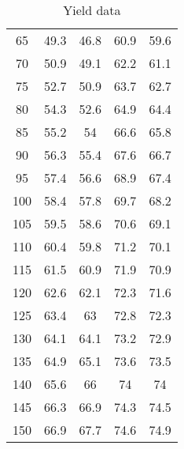 \documentclass[../Article_Model_Parameters.tex]{subfiles}
\begin{document}
\begin{table}[H]
\begin{tabular}{c|cccc}
			65       & 49.3                    & 46.8                    & 60.9                    & 59.6                    \\
			70       & 50.9                    & 49.1                    & 62.2                    & 61.1                    \\
			75       & 52.7                    & 50.9                    & 63.7                    & 62.7                    \\
			80       & 54.3                    & 52.6                    & 64.9                    & 64.4                    \\
			85       & 55.2                    & 54                      & 66.6                    & 65.8                    \\
			90       & 56.3                    & 55.4                    & 67.6                    & 66.7                    \\
			95       & 57.4                    & 56.6                    & 68.9                    & 67.4                    \\
			100      & 58.4                    & 57.8                    & 69.7                    & 68.2                    \\
			105      & 59.5                    & 58.6                    & 70.6                    & 69.1                    \\
			110      & 60.4                    & 59.8                    & 71.2                    & 70.1                    \\
			115      & 61.5                    & 60.9                    & 71.9                    & 70.9                    \\
			120      & 62.6                    & 62.1                    & 72.3                    & 71.6                    \\
			125      & 63.4                    & 63                      & 72.8                    & 72.3                    \\
			130      & 64.1                    & 64.1                    & 73.2                    & 72.9                    \\
			135      & 64.9                    & 65.1                    & 73.6                    & 73.5                    \\
			140      & 65.6                    & 66                      & 74                      & 74                      \\
			145      & 66.3                    & 66.9                    & 74.3                    & 74.5                    \\
			150      & 66.9                    & 67.7                    & 74.6                    & 74.9                   
		\end{tabular}
	\caption{Yield data}
	\label{tab: Yield_data}
	\end{table}
	
\end{document}
